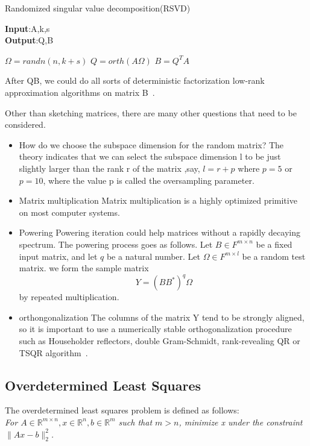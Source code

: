 \documentclass{article}
\begin{document}
\begin{algorithm}
	\caption{Randomized singular value decomposition(RSVD)} 
    \textbf{Input}:A,k,s\\
    \textbf{Output}:Q,B
	\begin{algorithmic}[1]
		\State$\Omega=randn(n,k+s)$
        \State$Q=orth(A\Omega)$
        \State$B=Q^TA$
	\end{algorithmic} 
    \label{algorithm 1}
\end{algorithm}
After QB, we could do all sorts of deterministic factorization low-rank approximation algorithms on matrix B~\cite{halko2010findingstructurerandomnessprobabilistic}.

Other than sketching matrices, there are many other questions that need to be considered.
\begin{itemize}
    \item How do we choose the subspace dimension for the random matrix?
     The theory\cite{halko2011finding} indicates that we can select the subspace dimension l to be just slightly larger than the rank r of the matrix ,say, $l=r+p$ where $p=5$ or $p=10$, where the value p is called the oversampling parameter.
    \item Matrix multiplication 
    Matrix multiplication is a highly optimized primitive on most computer systems.
    \item Powering Powering iteration could help matrices without a rapidly decaying spectrum. The powering process goes as follows. Let $B\in F^{m\times n}$ be a fixed input matrix, and let $q$ be a natural number. Let $\Omega\in F^{m\times l}$ be a random test matrix. we form the sample matrix \[Y=(BB^*)^q\Omega\] by repeated multiplication.
    \item orthongonalization The columns of the matrix Y tend to be strongly aligned, so it is important to use a numerically stable orthogonalization procedure such as Householder reflectors, double Gram-Schmidt, rank-revealing QR or TSQR algorithm~\cite{DBLP:journals/corr/abs-0806-2159}.


\end{itemize}
\subsection{Overdetermined Least Squares}
The overdetermined least squares problem is defined as follows: \\

\textit{For $A \in \mathbb{R}^{m \times n}, x \in \mathbb{R}^{n}, b \in \mathbb{R}^{m}$ such that $m > n$, minimize x under the constraint $\|Ax - b\|_2^2$.}\\
\end{document}
